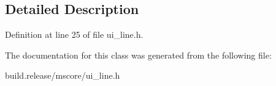 \subsection{Detailed Description}


Definition at line 25 of file ui\+\_\+line.\+h.



The documentation for this class was generated from the following file\+:\begin{DoxyCompactItemize}
\item 
build.\+release/mscore/ui\+\_\+line.\+h\end{DoxyCompactItemize}
